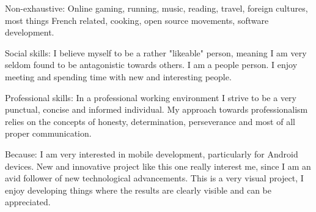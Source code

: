 \spacedhrule{1.6em}{-0.4em}

\inlineheadsection
  {Non-exhaustive:}
  {Online gaming, running, music, reading, travel, foreign cultures, most things French related, cooking, open source movements, software development.}

  
\spacedhrule{1.6em}{-0.4em}  
  

\inlineheadsection
  {Social skills:}
  {I believe myself to be a rather "likeable" person, meaning I am very seldom found to be antagonistic towards others. I am a people person. I enjoy meeting and spending time with new and interesting people.}
  
\inlineheadsection
  {Professional skills:}
  {In a professional working environment I strive to be a very punctual, concise and informed individual. My approach towards professionalism relies on the concepts of honesty, determination, perseverance and most of all proper communication.}
  
\spacedhrule{1.6em}{-0.4em}  
  

\inlineheadsection
  {Because:}
  {I am very interested in mobile development, particularly for Android devices. New and innovative project like this one really interest me, since I am an avid follower of new technological advancements. This is a very visual project, I enjoy developing things where the results are clearly visible and can be appreciated.}